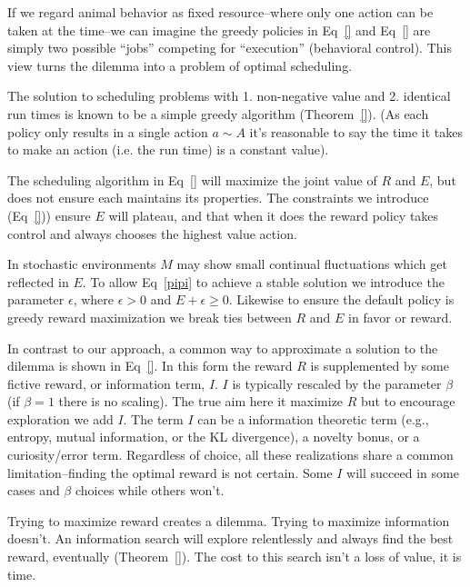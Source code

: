 \documentclass[9pt,twocolumn,twoside]{pnas-new}
\begin{document}
If we regard animal behavior as fixed resource--where only one action can be taken at the time--we can imagine the greedy policies in Eq~\ref{} and Eq~\ref{} are simply two possible ``jobs'' competing for ``execution'' (behavioral control). This view turns the dilemma into a problem of optimal scheduling. 

The solution to scheduling problems with 1. non-negative value and 2. identical run times is known to be a simple greedy algorithm (Theorem~\ref{}). (As each policy only results in a single action $a \sim A$ it's reasonable to say the time it takes to make an action (i.e. the run time) is a constant value).


The scheduling algorithm in Eq~\ref{} will maximize the joint value of $R$ and $E$, but does not ensure each maintains its properties. The constraints we introduce (Eq~\ref{})) ensure $E$ will plateau, and that when it does the reward policy takes control and always chooses the highest value action. 

In stochastic environments $M$ may show small continual fluctuations which get reflected in $E$. To allow Eq~\ref{pipi} to achieve a stable solution we introduce the parameter $\epsilon$, where $\epsilon > 0$ and $E + \epsilon \geq 0$. Likewise to ensure the default policy is greedy reward maximization we break ties between $R$ and $E$ in favor or reward.

In contrast to our approach, a common way to approximate a solution to the dilemma is shown in Eq~\ref{}. In this form the reward $R$ is supplemented by some fictive reward, or information term, $I$. $I$ is typically rescaled by the parameter $\beta$ (if $\beta = 1$ there is no scaling). The true aim here it maximize $R$ but to encourage exploration we add $I$. The term $I$ can be a information theoretic term (e.g., entropy, mutual information, or the KL divergence), a novelty bonus, or a curiosity/error term. Regardless of choice, all these realizations share a common limitation--finding the optimal reward is not certain. Some $I$ will succeed in some cases and $\beta$ choices while others won't. 

Trying to maximize reward creates a dilemma. Trying to maximize information doesn't. An information search will explore relentlessly and always find the best reward, eventually (Theorem~\ref{}). The cost to this search isn't a loss of value, it is time.  



\end{document}
